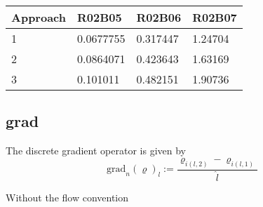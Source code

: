\documentclass[12pt]{article}
\begin{document}
\begin{table}[htbp]
\centering
\begin{tabular}{llll}
\toprule
Approach & R02B05 & R02B06 & R02B07 \\
\midrule
1 & 0.0677755 & 0.317447& 1.24704\\
2 & 0.0864071 & 0.423643& 1.63169\\
3 & 0.101011 & 0.482151& 1.90736\\
\bottomrule
\end{tabular}
\end{table}

\subsection{grad}
The discrete gradient operator is given by
\begin{equation}
  \text{grad}_n(\varrho)_l:=\frac{\varrho_{i(l,2)}-\varrho_{i(l,1)}}{\hat{l}}
\end{equation}

Without the flow convention
\end{document}
